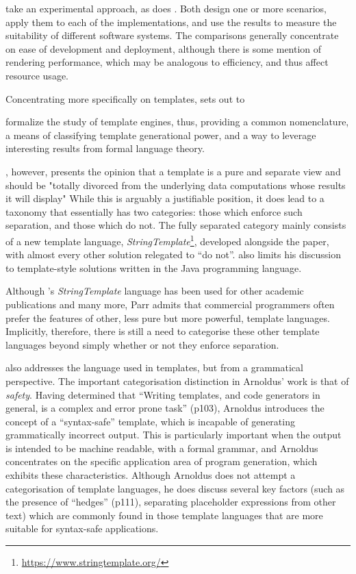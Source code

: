 \citet{Laakso2008} take an experimental approach, as does \citet{Zoio2005}. Both design one or more scenarios, apply them to each of the implementations, and use the results to measure the suitability of different software systems. The comparisons generally concentrate on ease of development and deployment, although there is some mention of rendering performance, which may be analogous to efficiency, and thus affect resource usage. 

Concentrating more specifically on templates, \citet{Parr2004} sets out to 

\begin{displayquote}
formalize the study of \gls{template engine}s, thus, providing a common nomenclature, a means of classifying template generational power, and a way to leverage interesting results from formal language theory. \citep{Parr2004}
\end{displayquote}

\citeauthor{Parr2004}, however, presents the opinion that a template is a pure and separate view and should be "totally divorced from the underlying data computations whose results it will display" \citep[p2]{Parr2004} While this is arguably a justifiable position, it does lead to a taxonomy that essentially has two categories: those which enforce such separation, and those which do not. The fully separated category mainly consists of a new \gls{template language}, \emph{StringTemplate}\footnote{\url{https://www.stringtemplate.org/}}, developed alongside the paper, with almost every other solution relegated to \enquote{do not}. \citeauthor{Parr2004} also limits his discussion to template-style solutions written in the Java \gls{programming language}.

Although \citeauthor{Parr2004}'s \emph{StringTemplate} language has been used for other academic publications \citep{Fritzson2009} \citep{Arnoldus2010} \citep{Hartmann2011} \citep{Arnoldus2012} \citep{Vollebregt2012} and many more, Parr admits that commercial programmers often prefer the features of other, less pure but more powerful, \gls{template language}s. Implicitly, therefore, there is still a need to categorise these other \gls{template language}s beyond simply whether or not they enforce separation.

\citet{Arnoldus2010} also addresses the language used in templates, but from a grammatical perspective. The important categorisation distinction in Arnoldus’ work is that of \emph{safety}. Having determined that \enquote{Writing templates, and code generators in general, is a complex and error prone task} (p103), Arnoldus introduces the concept of a \enquote{syntax-safe} template, which is incapable of generating grammatically incorrect output. This is particularly important when the output is intended to be machine readable, with a formal grammar, and Arnoldus concentrates on the specific application area of program generation, which exhibits these characteristics. Although Arnoldus does not attempt a categorisation of \gls{template language}s, he does discuss several key factors (such as the presence of \enquote{hedges} (p111), separating placeholder expressions from other text) which are commonly found in those \gls{template language}s that are more suitable for syntax-safe applications.


